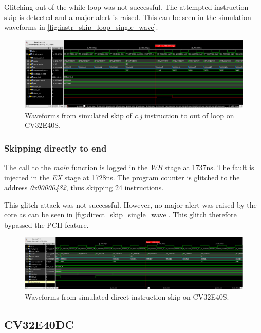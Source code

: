 Glitching out of the while loop was not successful. The attempted instruction skip is detected and a major alert is raised. This can be seen in the simulation waveforms in \autoref{fig:instr_skip_loop_single_wave}. 

\begin{figure}[h!]
    \centering
    \includegraphics[width=\textwidth]{docs/images/instr_skip_glitch_injection_single_core.png}
    \caption{Waveforms from simulated skip of \textit{c.j} instruction to out of loop on CV32E40S.}
    \label{fig:instr_skip_loop_single_wave}
\end{figure}

\subsubsection{Skipping directly to end}

The call to the \textit{main} function is logged in the \textit{WB} stage at 1737ns. The fault is injected in the \textit{EX} stage at 1728ns. The program counter is glitched to the address \textit{0x00000482}, thus skipping 24 instructions.

This glitch attack was not successful. However, no major alert was raised by the core as can be seen in \autoref{fig:direct_skip_single_wave}. This glitch therefore bypassed the PCH feature. 

\begin{figure}[h!]
    \centering
    \includegraphics[width=\textwidth]{docs/images/direct_skip_single_core.png}
    \caption{Waveforms from simulated direct instruction skip on CV32E40S.}
    \label{fig:direct_skip_single_wave}
\end{figure}

\subsection{CV32E40DC}
\label{subsec:dual_instr_skip}

